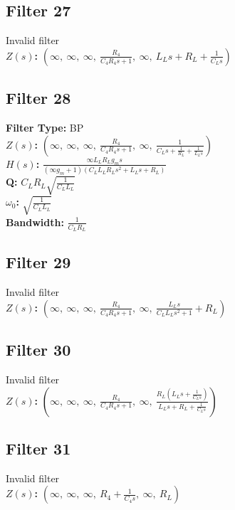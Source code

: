\documentclass{article}
\begin{document}
\subsection*{Filter 27}
Invalid filter \\ 
\textbf{$Z(s)$:} $\left( \infty, \  \infty, \  \infty, \  \frac{R_{4}}{C_{4} R_{4} s + 1}, \  \infty, \  L_{L} s + R_{L} + \frac{1}{C_{L} s}\right)$ \\ 
\subsection*{Filter 28}
\textbf{Filter Type:} BP \\ 
\textbf{$Z(s)$:} $\left( \infty, \  \infty, \  \infty, \  \frac{R_{4}}{C_{4} R_{4} s + 1}, \  \infty, \  \frac{1}{C_{L} s + \frac{1}{R_{L}} + \frac{1}{L_{L} s}}\right)$ \\ 
\textbf{$H(s)$:} $\frac{\infty L_{L} R_{L} g_{m} s}{\left(\infty g_{m} + 1\right) \left(C_{L} L_{L} R_{L} s^{2} + L_{L} s + R_{L}\right)}$ \\ 
\textbf{Q:} $C_{L} R_{L} \sqrt{\frac{1}{C_{L} L_{L}}}$ \\ 
\textbf{$\omega_0$:} $\sqrt{\frac{1}{C_{L} L_{L}}}$ \\ 
\textbf{Bandwidth:} $\frac{1}{C_{L} R_{L}}$ \\ 
\subsection*{Filter 29}
Invalid filter \\ 
\textbf{$Z(s)$:} $\left( \infty, \  \infty, \  \infty, \  \frac{R_{4}}{C_{4} R_{4} s + 1}, \  \infty, \  \frac{L_{L} s}{C_{L} L_{L} s^{2} + 1} + R_{L}\right)$ \\ 
\subsection*{Filter 30}
Invalid filter \\ 
\textbf{$Z(s)$:} $\left( \infty, \  \infty, \  \infty, \  \frac{R_{4}}{C_{4} R_{4} s + 1}, \  \infty, \  \frac{R_{L} \left(L_{L} s + \frac{1}{C_{L} s}\right)}{L_{L} s + R_{L} + \frac{1}{C_{L} s}}\right)$ \\ 
\subsection*{Filter 31}
Invalid filter \\ 
\textbf{$Z(s)$:} $\left( \infty, \  \infty, \  \infty, \  R_{4} + \frac{1}{C_{4} s}, \  \infty, \  R_{L}\right)$ \\ 
\end{document}
